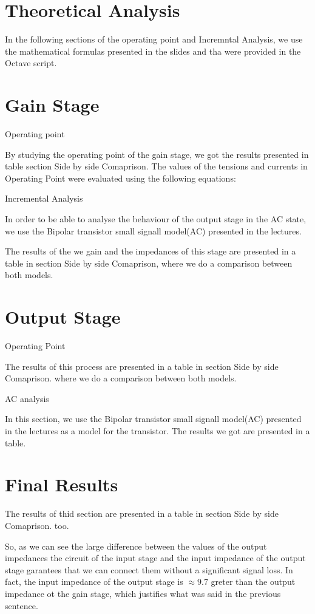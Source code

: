 \section{Theoretical Analysis}
\label{sec:analysis}

In the following sections of the operating point and Incremntal Analysis, we use the mathematical formulas presented in the slides
and tha were provided in the Octave script.

\section{Gain Stage}


Operating point

By studying the operating point of the gain stage, we got the results presented in table section Side by side Comaprison.
The values of the tensions and currents in Operating Point were evaluated using the following equations:


Incremental Analysis

In order to be able to analyse the behaviour of the output stage in the AC state, we use the Bipolar transistor small signall model(AC) presented in the lectures.

The results of the we gain and the impedances of this stage are presented in a table in section Side by side Comaprison, where we do a comparison between both models.


\section{Output Stage}

Operating Point

The results of this process are presented in a table in section Side by side Comaprison. where we do a comparison between both models.

AC analysis

In this section, we use the Bipolar transistor small signall model(AC) presented in the lectures as a model for the transistor.
The results we got are presented in a table.

\section{Final Results}

The results of thid section are presented in a table in section Side by side Comaprison. too.

So, as we can see the large difference between the values of the output impedances the circuit of
the input stage and the input impedance of the output stage garantees that we can connect them without
a significant signal loss.
In fact, the input impedance of the output stage is $\approx 9.7$ greter than the output impedance ot the gain stage,
which justifies what was said in the previous sentence.


